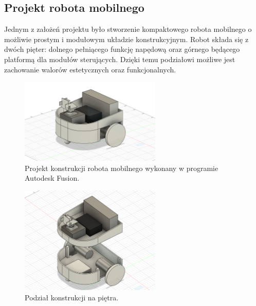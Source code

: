 \documentclass[a4paper,twoside,12pt]{book}
\begin{document}
\subsection{Projekt robota mobilnego}
Jednym z założeń projektu było stworzenie kompaktowego robota mobilnego o możliwie prostym i modułowym układzie konstrukcyjnym. Robot składa się z dwóch pięter: dolnego pełniącego funkcję napędową oraz górnego będącego platformą dla modułów sterujących. Dzięki temu podziałowi możliwe jest zachowanie walorów estetycznych oraz funkcjonalnych.
\begin{figure}[h]
    \centering
    \includegraphics[width=0.6\textwidth]{Images/Robot/Robot projekt.png}
    \caption{Projekt konstrukcji robota mobilnego wykonany w programie Autodesk Fusion.}
    \label{fig:Robot projekt}
\end{figure}
\begin{figure}[h]
    \centering
    \includegraphics[width=0.6\textwidth]{Images/Robot/Robot piętra.png}
    \caption{Podział konstrukcji na piętra.}
    \label{fig:Robot piętra}
\end{figure}
\end{document}
